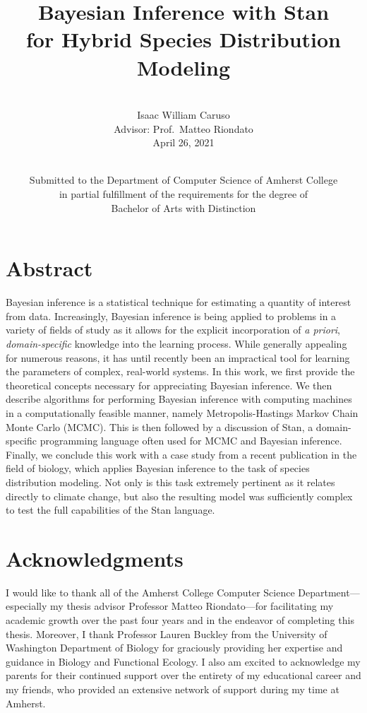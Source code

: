 \documentclass[
  12pt,
  oneside]{book}
\title{Bayesian Inference with Stan\\
for Hybrid Species Distribution Modeling}
\subtitle{\hfill\break
\vspace{+20truemm}\\
Isaac William Caruso\\
Advisor: Prof.~Matteo Riondato\\
April 26, 2021}
\author{\vspace{+45truemm}\\
Submitted to the Department of Computer Science of Amherst College\\
in partial fulfillment of the requirements for the degree of\\
Bachelor of Arts with Distinction}
\date{}
\theoremstyle{definition}
\theoremstyle{definition}
\theoremstyle{definition}
\theoremstyle{remark}
\begin{document}
\maketitle

{
\setcounter{tocdepth}{1}
\tableofcontents
}
\hypertarget{abstract}{%
\chapter*{Abstract}\label{abstract}}

Bayesian inference is a statistical technique for estimating a quantity of interest from data.
Increasingly, Bayesian inference is being applied to problems in a variety of fields of study as it allows for the explicit incorporation of \emph{a priori}, \emph{domain-specific} knowledge into the learning process.
While generally appealing for numerous reasons, it has until recently been an impractical tool for learning the parameters of complex, real-world systems.
In this work, we first provide the theoretical concepts necessary for appreciating Bayesian inference.
We then describe algorithms for performing Bayesian inference with computing machines in a computationally feasible manner, namely Metropolis-Hastings Markov Chain Monte Carlo (MCMC).
This is then followed by a discussion of Stan, a domain-specific programming language often used for MCMC and Bayesian inference.
Finally, we conclude this work with a case study from a recent publication in the field of biology, which applies Bayesian inference to the task of species distribution modeling.
Not only is this task extremely pertinent as it relates directly to climate change, but also the resulting model was sufficiently complex to test the full capabilities of the Stan language.

\hypertarget{acknowledgments}{%
\chapter*{Acknowledgments}\label{acknowledgments}}

I would like to thank all of the Amherst College Computer Science Department---especially my thesis advisor Professor Matteo Riondato---for facilitating my academic growth over the past four years and in the endeavor of completing this thesis.
Moreover, I thank Professor Lauren Buckley from the University of Washington Department of Biology for graciously providing her expertise and guidance in Biology and Functional Ecology.
I also am excited to acknowledge my parents for their continued support over the entirety of my educational career and my friends, who provided an extensive network of support during my time at Amherst.
\end{document}
